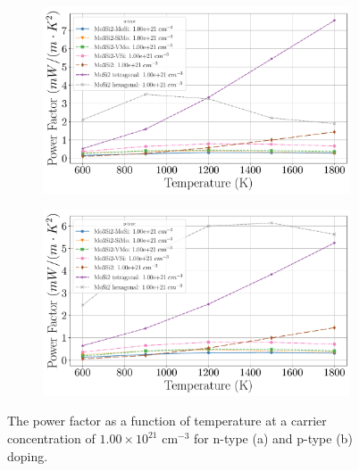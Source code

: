 \documentclass[7.5pt]{article}
\theoremstyle{plain}
\theoremstyle{definition}
\newcommand{\<}{\langle}
\renewcommand{\>}{\rangle}
\begin{document}
\begin{figure}
\centering
\begin{subfigure}{.5\textwidth}
  \centering
  \includegraphics[width=\linewidth]{allmats_Po_temp_doping_n}
  \caption{}
  \label{fig:sub1}
\end{subfigure}%
\begin{subfigure}{.5\textwidth}
  \centering
  \includegraphics[width=\linewidth]{allmats_Po_temp_doping_p}
  \caption{}
  \label{fig:sub2}
\end{subfigure}
\caption{The power factor as a function of temperature at a carrier concentration of $1.00 \times 10^{21}$ cm$^{-3}$ for n-type (a) and p-type (b) doping.}
\label{fig:Po-T}
\end{figure}
\end{document}
